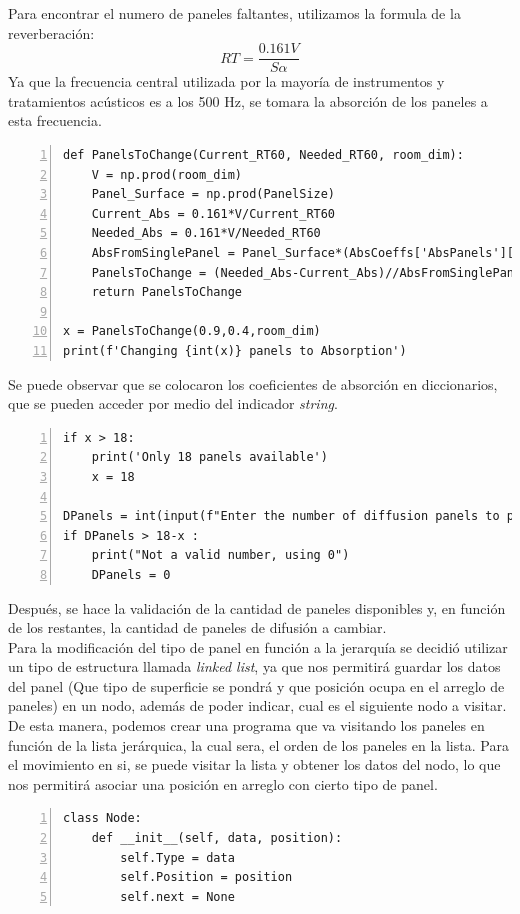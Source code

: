 Para encontrar el numero de paneles faltantes, utilizamos la formula de la reverberación: 
\begin{equation}
    RT = \frac{0.161 V}{S \alpha}
\end{equation}
Ya que la frecuencia central utilizada por la mayoría de instrumentos y tratamientos acústicos es a los 500 Hz, se tomara la absorción de los paneles a esta frecuencia. 
\begin{lstlisting}[frame=single,numbers=left, style=matlab-editor, basicstyle=\tiny]
def PanelsToChange(Current_RT60, Needed_RT60, room_dim):
    V = np.prod(room_dim)
    Panel_Surface = np.prod(PanelSize)
    Current_Abs = 0.161*V/Current_RT60
    Needed_Abs = 0.161*V/Needed_RT60
    AbsFromSinglePanel = Panel_Surface*(AbsCoeffs['AbsPanels'][6]-AbsCoeffs['Concrete'][6])
    PanelsToChange = (Needed_Abs-Current_Abs)//AbsFromSinglePanel
    return PanelsToChange

x = PanelsToChange(0.9,0.4,room_dim)
print(f'Changing {int(x)} panels to Absorption')
\end{lstlisting}
Se puede observar que se colocaron los coeficientes de absorción en diccionarios, que se pueden acceder por medio del indicador \textit{string}.
\begin{lstlisting}[frame=single,numbers=left, style=matlab-editor, basicstyle=\tiny]
if x > 18:
    print('Only 18 panels available')
    x = 18

DPanels = int(input(f"Enter the number of diffusion panels to put ({18-x} Available): "))
if DPanels > 18-x :
    print("Not a valid number, using 0")
    DPanels = 0
\end{lstlisting}
Después, se hace la validación de la cantidad de paneles disponibles y, en función de los restantes, la cantidad de paneles de difusión a cambiar.\\
Para la modificación del tipo de panel en función a la jerarquía se decidió utilizar un tipo de estructura llamada \textit{linked list}, ya que nos permitirá guardar los datos del panel (Que tipo de superficie se pondrá y que posición ocupa en el arreglo de paneles) en un nodo, además de poder indicar, cual es el siguiente nodo a visitar. De esta manera, podemos crear una programa que va visitando los paneles en función de la lista jerárquica, la cual sera, el orden de los paneles en la lista. Para el movimiento en si, se puede visitar la lista y obtener los datos del nodo, lo que nos permitirá asociar una posición en arreglo con cierto tipo de panel.
\begin{lstlisting}[frame=single,numbers=left, style=matlab-editor, basicstyle=\tiny]
class Node:
    def __init__(self, data, position):
        self.Type = data
        self.Position = position
        self.next = None
\end{lstlisting}

